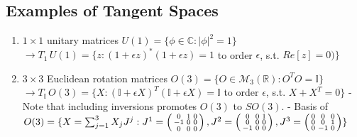 \subsection*{Examples of Tangent Spaces}

\begin{enumerate}
\item $1 \times 1$ unitary matrices $U(1) = \{ \phi \in \mathbb{C} : |\phi|^2 = 1 \}$
\subitem $\rightarrow T_1 \, U(1) = \{ z: (1+\epsilon z)^* (1+\epsilon z) = 1$ to order $\epsilon$,  s.t. $Re[z]=0) \}$

\item $3 \times 3$ Euclidean rotation matrices $O(3) = \{ O \in \mathcal{M}_3(\mathbb{R}) : O^T O = \mathbb{I} \}$
\subitem $\rightarrow T_{\mathbb{I}} \, O(3) = \{ X : (\mathbb{I} + \epsilon X)^T (\mathbb{I} + \epsilon X) = \mathbb{I}$ to order $\epsilon$, s.t. $X + X^T = 0 \}$
\subitem - Note that including inversions promotes $O(3)$ to $SO(3)$.
\subitem - Basis of $O(3) = \\ \{ X = \sum_{j=1}^3 X_j J^j : J^1 = \left(\begin{smallmatrix} 0&1&0 \\ -1&0&0 \\ 0&0&0 \end{smallmatrix}\right), J^2 = \left(\begin{smallmatrix} 0&0&1 \\ 0&0&0 \\ -1&0&0 \end{smallmatrix}\right), J^3 = \left(\begin{smallmatrix} 0&0&0 \\ 0&0&1 \\ 0&-1&0 \end{smallmatrix}\right) \}$


\end{enumerate}
